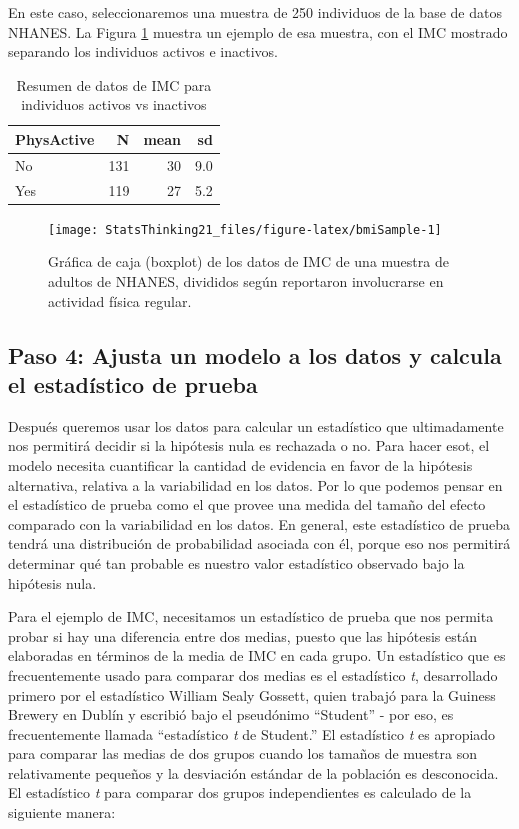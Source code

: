\documentclass[
  12pt,
]{book}
\begin{document}
En este caso, seleccionaremos una muestra de 250 individuos de la base de datos NHANES. La Figura \ref{fig:bmiSample} muestra un ejemplo de esa muestra, con el IMC mostrado separando los individuos activos e inactivos.

\begin{table}

\caption{\label{tab:unnamed-chunk-36}Resumen de datos de IMC para individuos activos vs inactivos}
\centering
\begin{tabular}[t]{l|r|r|r}
\hline
PhysActive & N & mean & sd\\
\hline
No & 131 & 30 & 9.0\\
\hline
Yes & 119 & 27 & 5.2\\
\hline
\end{tabular}
\end{table}

\begin{figure}
\texttt{[image: StatsThinking21\_files/figure-latex/bmiSample-1]} \caption{Gráfica de caja (boxplot) de los datos de IMC de una muestra de adultos de NHANES, divididos según reportaron involucrarse en actividad física regular.}\label{fig:bmiSample}
\end{figure}

\hypertarget{paso-4-ajusta-un-modelo-a-los-datos-y-calcula-el-estaduxedstico-de-prueba}{%
\subsection{Paso 4: Ajusta un modelo a los datos y calcula el estadístico de prueba}\label{paso-4-ajusta-un-modelo-a-los-datos-y-calcula-el-estaduxedstico-de-prueba}}

Después queremos usar los datos para calcular un estadístico que ultimadamente nos permitirá decidir si la hipótesis nula es rechazada o no. Para hacer esot, el modelo necesita cuantificar la cantidad de evidencia en favor de la hipótesis alternativa, relativa a la variabilidad en los datos. Por lo que podemos pensar en el estadístico de prueba como el que provee una medida del tamaño del efecto comparado con la variabilidad en los datos. En general, este estadístico de prueba tendrá una distribución de probabilidad asociada con él, porque eso nos permitirá determinar qué tan probable es nuestro valor estadístico observado bajo la hipótesis nula.

Para el ejemplo de IMC, necesitamos un estadístico de prueba que nos permita probar si hay una diferencia entre dos medias, puesto que las hipótesis están elaboradas en términos de la media de IMC en cada grupo. Un estadístico que es frecuentemente usado para comparar dos medias es el estadístico \emph{t}, desarrollado primero por el estadístico William Sealy Gossett, quien trabajó para la Guiness Brewery en Dublín y escribió bajo el pseudónimo ``Student'' - por eso, es frecuentemente llamada ``estadístico \emph{t} de Student.'' El estadístico \emph{t} es apropiado para comparar las medias de dos grupos cuando los tamaños de muestra son relativamente pequeños y la desviación estándar de la población es desconocida. El estadístico \emph{t} para comparar dos grupos independientes es calculado de la siguiente manera:
\end{document}
